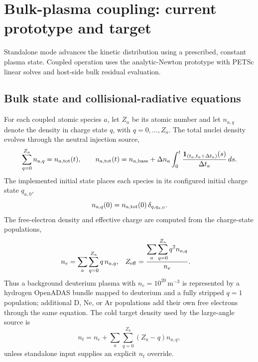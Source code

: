 \documentclass[11pt]{article}
\begin{document}
\section{Bulk-plasma coupling: current prototype and target}
\label{sec:bulk_coupling}

Standalone mode advances the kinetic distribution using a prescribed, constant plasma
state.  Coupled operation uses the analytic-Newton prototype with PETSc linear solves
and host-side bulk residual evaluation.

\subsection{Bulk state and collisional-radiative equations}

For each coupled atomic species $a$, let $Z_a$ be its atomic number and let
$n_{a,q}$ denote the density in charge state $q$, with $q=0,\ldots,Z_a$.  The total
nuclei density evolves through the neutral injection source,
\begin{equation}
 \sum_{q=0}^{Z_a} n_{a,q}=n_{a,\rm tot}(t),
 \qquad
 n_{a,\rm tot}(t)=n_{a,\rm base}
 +\Delta n_a\int_0^t
 \frac{\mathbf 1_{(t_a,t_a+\Delta t_a)}(s)}{\Delta t_a}\,ds.
\label{eq:bulk_nuclei_conservation}
\end{equation}
The implemented initial state places each species in its configured initial charge state
$q_{a,0}$,
\begin{equation}
 n_{a,q}(0)=n_{a,\rm tot}(0)\,\delta_{q,q_{a,0}}.
 \label{eq:bulk_initial_charge_state}
\end{equation}
The free-electron density and effective charge are computed from the charge-state
populations,
\begin{align}
 n_e &= \sum_a\sum_{q=0}^{Z_a}q\,n_{a,q},
 & Z_{\rm eff} &=
 \frac{\displaystyle\sum_a\sum_{q=0}^{Z_a}q^2 n_{a,q}}{n_e}.
 \label{eq:bulk_electron_density_zeff}
\end{align}
Thus a background deuterium plasma with $n_e=10^{20}\,\mathrm{m}^{-3}$ is represented
by a hydrogen OpenADAS bundle mapped to deuterium and a fully stripped $q=1$ population;
additional D, Ne, or Ar populations add their own free electrons through the same equation.
The cold target density used by the large-angle source is
\begin{equation}
 n_t=n_e+\sum_a\sum_{q=0}^{Z_a}(Z_a-q)n_{a,q},
 \label{eq:bulk_target_density}
\end{equation}
unless standalone input supplies an explicit $n_t$ override.
\end{document}
